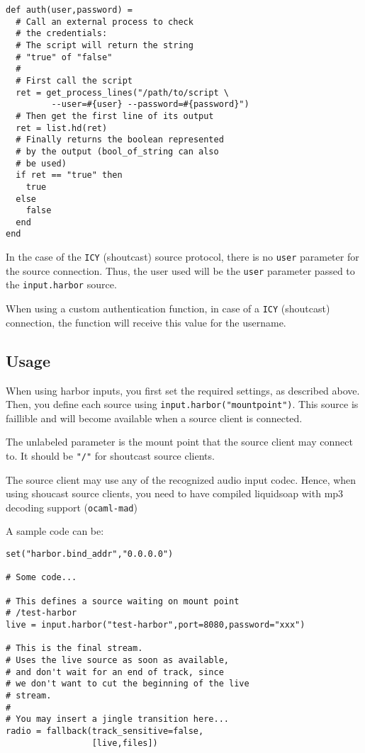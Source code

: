\begin{verbatim}
def auth(user,password) = 
  # Call an external process to check 
  # the credentials:
  # The script will return the string 
  # "true" of "false"
  #
  # First call the script
  ret = get_process_lines("/path/to/script \
         --user=#{user} --password=#{password}")
  # Then get the first line of its output
  ret = list.hd(ret)
  # Finally returns the boolean represented 
  # by the output (bool_of_string can also 
  # be used)
  if ret == "true" then
    true
  else
    false
  end
end
\end{verbatim}
In the case of the \verb+ICY+ (shoutcast) source protocol, there is no \verb+user+ parameter 
for the source connection. Thus, the user used will be the \verb+user+ parameter passed 
to the \verb+input.harbor+ source.

When using a custom authentication function, in case of a \verb+ICY+ (shoutcast) connection, 
the function will receive this value for the username.

\subsection{Usage}
When using harbor inputs, you first set the required settings, as described above. Then, you define each source using \verb+input.harbor("mountpoint")+. This source is faillible and will become available when a source client is connected. 

The unlabeled parameter is the mount point that the source client may connect
to. It should be \verb+"/"+ for shoutcast source clients.

The source client may use any of the recognized audio input codec. Hence, when using shoucast source clients, you need to have compiled liquidsoap with mp3 decoding support (\verb+ocaml-mad+)

A sample code can be:

\begin{verbatim}
set("harbor.bind_addr","0.0.0.0")

# Some code...

# This defines a source waiting on mount point 
# /test-harbor
live = input.harbor("test-harbor",port=8080,password="xxx")

# This is the final stream.
# Uses the live source as soon as available,
# and don't wait for an end of track, since 
# we don't want to cut the beginning of the live
# stream.
#
# You may insert a jingle transition here...
radio = fallback(track_sensitive=false,
                 [live,files])
\end{verbatim}

